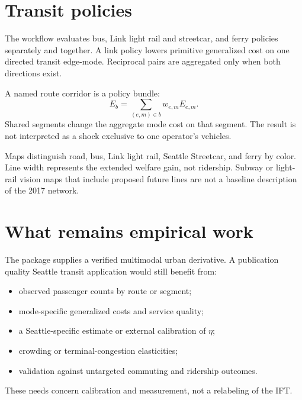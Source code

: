 \section{Transit policies}

The workflow evaluates bus, Link light rail and streetcar, and ferry policies
separately and together. A link policy lowers primitive generalized cost on
one directed transit edge-mode. Reciprocal pairs are aggregated only when both
directions exist.

A named route corridor is a policy bundle:
\[
 E_b=\sum_{(e,m)\in b}w_{e,m}E_{e,m}.
\]
Shared segments change the aggregate mode cost on that segment. The result is
not interpreted as a shock exclusive to one operator's vehicles.

Maps distinguish road, bus, Link light rail, Seattle Streetcar, and ferry by
color. Line width represents the extended welfare gain, not ridership.
Subway or light-rail vision maps that include proposed future lines are not a
baseline description of the 2017 network.

\section{What remains empirical work}

The package supplies a verified multimodal urban derivative. A publication
quality Seattle transit application would still benefit from:
\begin{itemize}
  \item observed passenger counts by route or segment;
  \item mode-specific generalized costs and service quality;
  \item a Seattle-specific estimate or external calibration of \(\eta\);
  \item crowding or terminal-congestion elasticities;
  \item validation against untargeted commuting and ridership outcomes.
\end{itemize}
These needs concern calibration and measurement, not a relabeling of the IFT.
